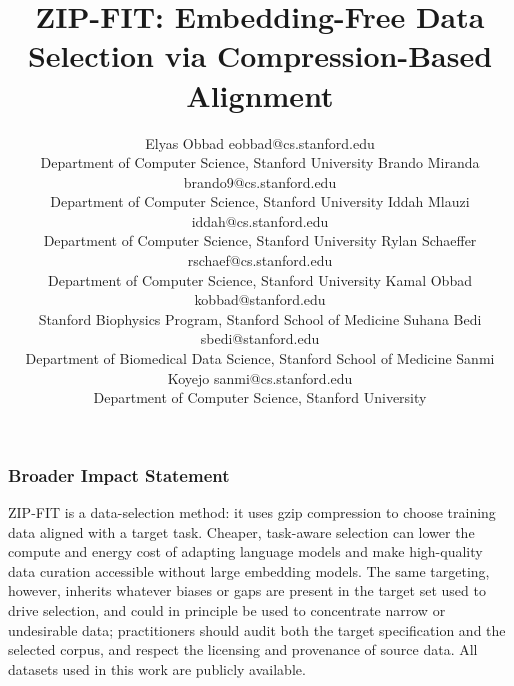 \documentclass{article}
\begin{document}
\title{ZIP-FIT: Embedding-Free Data Selection via Compression-Based Alignment}

\author{\name Elyas Obbad \email eobbad@cs.stanford.edu \\
  \addr Department of Computer Science, Stanford University
  \AND
  \name Brando Miranda \email brando9@cs.stanford.edu \\
  \addr Department of Computer Science, Stanford University
  \AND
  \name Iddah Mlauzi \email iddah@cs.stanford.edu \\
  \addr Department of Computer Science, Stanford University
  \AND
  \name Rylan Schaeffer \email rschaef@cs.stanford.edu \\
  \addr Department of Computer Science, Stanford University
  \AND
  \name Kamal Obbad \email kobbad@stanford.edu \\
  \addr Stanford Biophysics Program, Stanford School of Medicine
  \AND
  \name Suhana Bedi \email sbedi@stanford.edu \\
  \addr Department of Biomedical Data Science, Stanford School of Medicine
  \AND
  \name Sanmi Koyejo \email sanmi@cs.stanford.edu \\
  \addr Department of Computer Science, Stanford University
}

\maketitle










\subsubsection*{Broader Impact Statement}
ZIP-FIT is a data-selection method: it uses gzip compression to choose training data aligned with a target task.
Cheaper, task-aware selection can lower the compute and energy cost of adapting language models and make high-quality data curation accessible without large embedding models.
The same targeting, however, inherits whatever biases or gaps are present in the target set used to drive selection, and could in principle be used to concentrate narrow or undesirable data; practitioners should audit both the target specification and the selected corpus, and respect the licensing and provenance of source data.
All datasets used in this work are publicly available.
\end{document}
